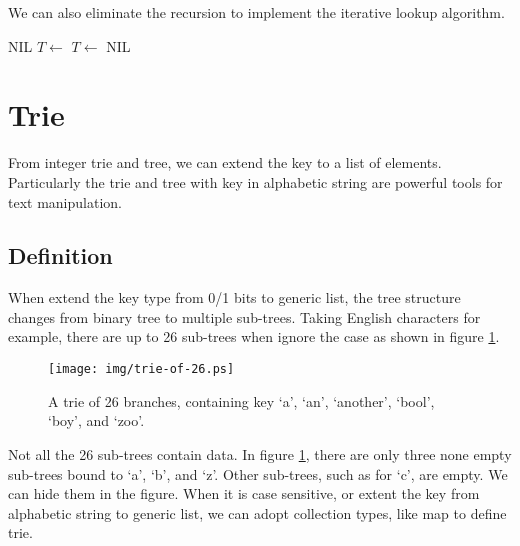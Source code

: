 \documentclass[b5paper]{article}
\begin{document}
We can also eliminate the recursion to implement the iterative lookup algorithm.

\begin{algorithmic}[1]
    \State \Return NIL
  \EndIf
      \State $T \gets$ 
    \Else
      \State $T \gets$ 
    \EndIf
  \EndWhile
    \State \Return {}
  \Else
    \State \Return NIL
  \EndIf
\EndFunction
\end{algorithmic}

\begin{Exercise}
\end{Exercise}

\section{Trie}
From integer trie and tree, we can extend the key to a list of elements. Particularly the trie and tree with key in alphabetic string are powerful tools for text manipulation.

\subsection{Definition}
When extend the key type from 0/1 bits to generic list, the tree structure changes from binary tree to multiple sub-trees. Taking English characters for example, there are up to 26 sub-trees when ignore the case as shown in figure \ref{fig:trie-of-26}.

\begin{figure}[htbp]
  \centering
  \texttt{[image: img/trie-of-26.ps]}
  \caption{A trie of 26 branches, containing key `a', `an', `another', `bool', `boy', and `zoo'.}
  \label{fig:trie-of-26}
\end{figure}

Not all the 26 sub-trees contain data. In figure \ref{fig:trie-of-26}, there are only three none empty sub-trees bound to `a', `b', and `z'. Other sub-trees, such as for `c', are empty. We can hide them in the figure. When it is case sensitive, or extent the key from alphabetic string to generic list, we can adopt collection types, like map to define trie.
\end{document}
